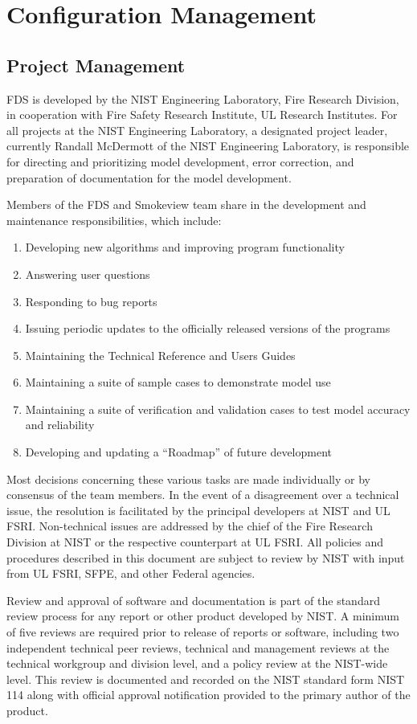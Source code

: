 \documentclass[11pt]{book}
\begin{document}
\chapter{Configuration Management}

\section{Project Management}

FDS is developed by the NIST Engineering Laboratory, Fire Research Division, in cooperation with Fire Safety Research Institute, UL Research Institutes. For all projects at the NIST Engineering Laboratory, a designated project leader, currently Randall McDermott of the NIST Engineering Laboratory, is responsible for directing and prioritizing model development, error correction, and preparation of documentation for the model development.

Members of the FDS and Smokeview team share in the development and maintenance responsibilities, which include:
\begin{enumerate}
\item Developing new algorithms and improving program functionality
\item Answering user questions
\item Responding to bug reports
\item Issuing periodic updates to the officially released versions of the programs
\item Maintaining the Technical Reference and Users Guides
\item Maintaining a suite of sample cases to demonstrate model use
\item Maintaining a suite of verification and validation cases to test model accuracy and reliability
\item Developing and updating a ``Roadmap'' of future development
\end{enumerate}
Most decisions concerning these various tasks are made individually or by consensus of the team members. In the event of a disagreement over a technical issue, the resolution is facilitated by the principal developers at NIST and UL FSRI. Non-technical issues are addressed by the chief of the Fire Research Division at NIST or the respective counterpart at UL FSRI. All policies and procedures described in this document are subject to review by NIST with input from UL FSRI, SFPE, and other Federal agencies.

Review and approval of software and documentation is part of the standard review process for any report or other product developed by NIST. A minimum of five reviews are required prior to release of reports or software, including two independent technical peer reviews, technical and management reviews at the technical workgroup and division level, and a policy review at the NIST-wide level.  This review is documented and recorded on the NIST standard form NIST 114 along with official approval notification provided to the primary author of the product.
\end{document}
